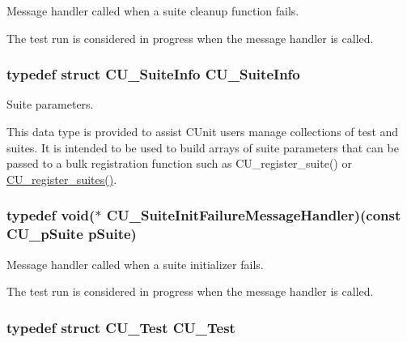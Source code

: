 Message handler called when a suite cleanup function fails. 

The test run is considered in progress when the message handler is called. \hypertarget{group___framework_ga345177d10f56a80873124d47cae930f0}{
\subsubsection[{C\+U\+\_\+\+Suite\+Info}]{\setlength{\rightskip}{0pt plus 5cm}typedef struct {\bf C\+U\+\_\+\+Suite\+Info}  {\bf C\+U\+\_\+\+Suite\+Info}}}\label{group___framework_ga345177d10f56a80873124d47cae930f0}


Suite parameters. 

This data type is provided to assist C\+Unit users manage collections of test and suites. It is intended to be used to build arrays of suite parameters that can be passed to a bulk registration function such as C\+U\+\_\+register\+\_\+suite() or \hyperlink{group___framework_ga331001da0a8bd8faececdb48e7ad3f96}{C\+U\+\_\+register\+\_\+suites()}. \hypertarget{group___framework_ga53faf49a6045a1fc32c5a0287b800b65}{
\subsubsection[{C\+U\+\_\+\+Suite\+Init\+Failure\+Message\+Handler}]{\setlength{\rightskip}{0pt plus 5cm}typedef void($\ast$ C\+U\+\_\+\+Suite\+Init\+Failure\+Message\+Handler)(const {\bf C\+U\+\_\+p\+Suite} p\+Suite)}}\label{group___framework_ga53faf49a6045a1fc32c5a0287b800b65}


Message handler called when a suite initializer fails. 

The test run is considered in progress when the message handler is called. \hypertarget{group___framework_ga0bc6468b9781a574e2c7994ca700ee1e}{
\subsubsection[{C\+U\+\_\+\+Test}]{\setlength{\rightskip}{0pt plus 5cm}typedef struct {\bf C\+U\+\_\+\+Test}  {\bf C\+U\+\_\+\+Test}}}\label{group___framework_ga0bc6468b9781a574e2c7994ca700ee1e}


